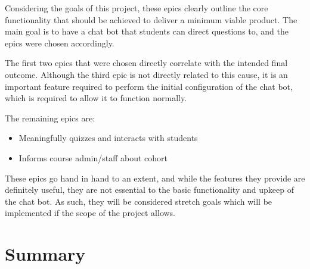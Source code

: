 \documentclass{article}
\begin{document}
Considering the goals of this project, these epics clearly outline the core functionality that should be achieved to deliver a minimum viable product. The main goal is to have a chat bot that students can direct questions to, and the epics were chosen accordingly.

The first two epics that were chosen directly correlate with the intended final outcome. Although the third epic is not directly related to this cause, it is an important feature required to perform the initial configuration of the chat bot, which is required to allow it to function normally.

The remaining epics are:
\begin{itemize}
  \item Meaningfully quizzes and interacts with students
  \item Informs course admin/staff about cohort
\end{itemize}

These epics go hand in hand to an extent, and while the features they provide are definitely useful, they are not essential to the basic functionality and upkeep of the chat bot. As such, they will be considered stretch goals which will be implemented if the scope of the project allows.

\section{Summary}
\end{document}

